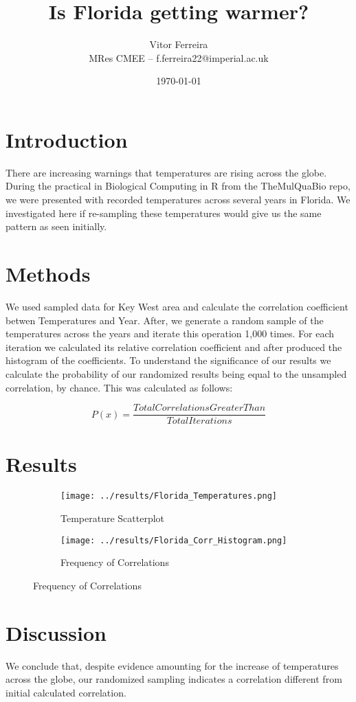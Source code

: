 \documentclass[12pt]{article}
\title{Is Florida getting warmer?}
\author{Vitor Ferreira \\ MRes CMEE -- f.ferreira22@imperial.ac.uk}
\date{\today}
\begin{document}
  \maketitle
  
    \section{Introduction}

    There are increasing warnings that temperatures are rising across the globe. During the practical in Biological Computing in R from the TheMulQuaBio repo, we were presented with recorded temperatures across several years in Florida. We investigated here if re-sampling these temperatures would give us the same pattern as seen initially.
    
  \section{Methods}

    We used sampled data for Key West area and calculate the correlation coefficient betwen Temperatures and Year.
    After, we generate a random sample of the temperatures across the years and iterate this operation 1,000 times. For each iteration we calculated its relative correlation coefficient and after produced the histogram of the coefficients. To understand the significance of our results we calculate the probability of our randomized results being equal to the unsampled correlation, by chance.
    This was calculated as follows:
  
  \begin{equation}
    P(x) = \frac{TotalCorrelationsGreaterThan}{Total Iterations}
  \end{equation}


  \section{Results}

    \begin{figure}[H]
      \centering
      \begin{subfigure}{.45\textwidth}
        \centering
        \texttt{[image: ../results/Florida\_Temperatures.png]}
        \caption{Temperature Scatterplot}
        \label{fig:sub1}
      \end{subfigure}
      \begin{subfigure}{.45\textwidth}
        \centering
        \texttt{[image: ../results/Florida\_Corr\_Histogram.png]}
        \caption{Frequency of Correlations}
        \label{fig:sub2}
      \end{subfigure}
      \label{fig:test}
    \end{figure}


  \section{Discussion}

    We conclude that, despite evidence amounting for the increase of temperatures across the globe, our randomized sampling indicates a correlation different from initial calculated correlation.
    
    
  
   
\end{document}
